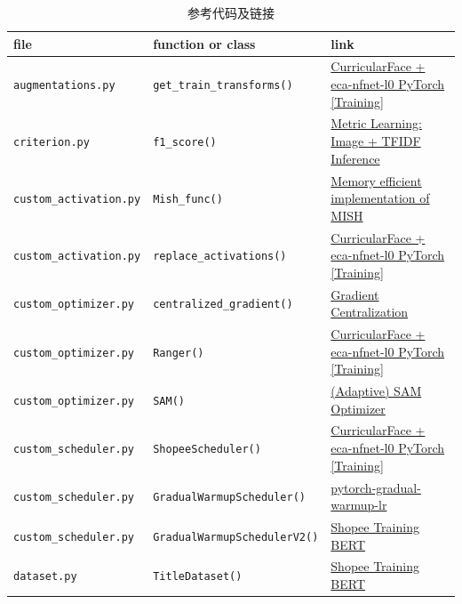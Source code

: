 \documentclass[12pt]{article}
\begin{document}
\begin{table}[htbp]
  \centering
  \footnotesize
  \caption{参考代码及链接}
  \label{tab:code_refs}
  \begin{tabular}{lll}
    \toprule
    file & function or class       & link   \\
    \midrule
    \verb|augmentations.py|    & \verb|get_train_transforms()| & \href{https://www.kaggle.com/parthdhameliya77/curricularface-eca-nfnet-l0-pytorch-training}{CurricularFace + eca-nfnet-l0 PyTorch [Training]}   \\
    \verb|criterion.py| & \verb|f1_score()| & \href{https://www.kaggle.com/tanulsingh077/metric-learning-image-tfidf-inference}{Metric Learning: Image + TFIDF Inference} \\
    \verb|custom_activation.py| & \verb|Mish_func()| & \href{https://github.com/tyunist/memory_efficient_mish_swish/blob/master/mish.py}{Memory efficient implementation of MISH} \\
    \verb|custom_activation.py| & \verb|replace_activations()| & \href{https://www.kaggle.com/parthdhameliya77/curricularface-eca-nfnet-l0-pytorch-training}{CurricularFace + eca-nfnet-l0 PyTorch [Training]} \\
    \verb|custom_optimizer.py| & \verb|centralized_gradient()| & \href{https://github.com/Yonghongwei/Gradient-Centralization}{Gradient Centralization} \\
    \verb|custom_optimizer.py| & \verb|Ranger()| & \href{https://www.kaggle.com/parthdhameliya77/curricularface-eca-nfnet-l0-pytorch-training}{CurricularFace + eca-nfnet-l0 PyTorch [Training]} \\
    \verb|custom_optimizer.py| & \verb|SAM()| & \href{https://github.com/davda54/sam/blob/main/sam.py}{(Adaptive) SAM Optimizer} \\
    \verb|custom_scheduler.py| & \verb|ShopeeScheduler()| & \href{https://www.kaggle.com/parthdhameliya77/curricularface-eca-nfnet-l0-pytorch-training}{CurricularFace + eca-nfnet-l0 PyTorch [Training]} \\
    \verb|custom_scheduler.py| & \verb|GradualWarmupScheduler()| & \href{https://github.com/ildoonet/pytorch-gradual-warmup-lr}{pytorch-gradual-warmup-lr} \\
    \verb|custom_scheduler.py| & \verb|GradualWarmupSchedulerV2()| & \href{https://www.kaggle.com/shigemitsutomizawa/shopee-training-bert-11th-place-simple-solution}{Shopee Training BERT} \\
    \verb|dataset.py| & \verb|TitleDataset()| & \href{https://www.kaggle.com/shigemitsutomizawa/shopee-training-bert-11th-place-simple-solution}{Shopee Training BERT} \\

\end{tabular}
\end{table}
\end{document}
